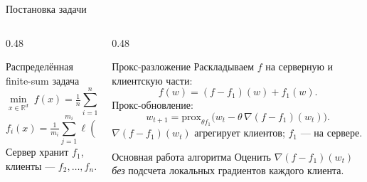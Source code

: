 \documentclass[10pt,aspectratio=169,t]{beamer}
\newcommand{\nablaf}[1]{\nabla(f - f_1)(#1)}
\begin{document}
\begin{frame}{Постановка задачи}
\begin{columns}[T,onlytextwidth]
\begin{column}{0.48\textwidth}
\begin{block}{Распределённая finite-sum задача}
\[
\min_{x \in \mathbb{R}^d}\; f(x) = \tfrac{1}{n}\sum_{i=1}^n f_i(x),
\]
\[
f_i(x) = \tfrac{1}{m_i}\sum_{j=1}^{m_i}\ell(g(x,a_j^i),b_j^i).
\]
Сервер хранит $f_1$, клиенты — $f_2,\ldots,f_n$.
\end{block}
\end{column}

\begin{column}{0.48\textwidth}
\begin{block}{Прокс-разложение \citep{lin2023stochastic}}
Раскладываем $f$ на серверную и клиентскую части:
\[
f(w) = (f - f_1)(w) + f_1(w).
\]
Прокс-обновление:
\[
w_{t+1} = \mathrm{prox}_{\theta f_1}\bigl(w_t - \theta\,\nablaf{w_t}\bigr).
\]
$\nablaf{w_t}$ агрегирует клиентов; $f_1$ — на сервере.
\end{block}

\vspace{2mm}
\begin{alertblock}{Основная работа алгоритма}
Оценить $\nablaf{w_t}$ \emph{без} подсчета локальных градиентов каждого клиента. 
\end{alertblock}
\end{column}
\end{columns}
\end{frame}



\end{document}
